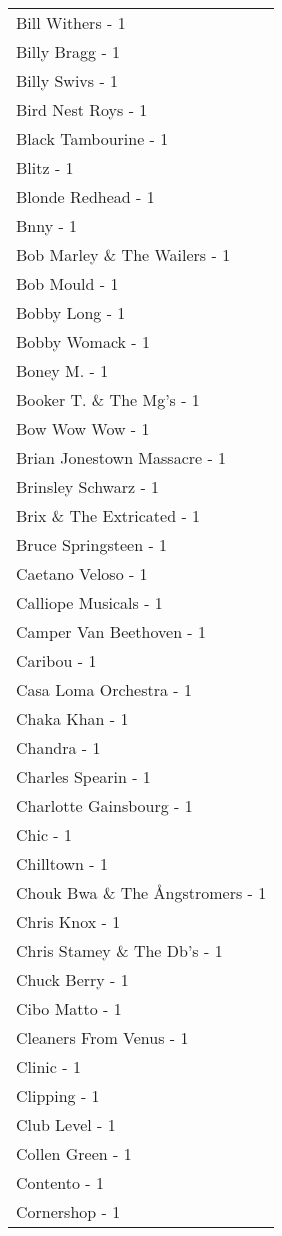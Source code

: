 \documentclass[
]{article}
\begin{document}
\begin{longtable}{l}
Bill Withers - 1 \\ 
Billy Bragg - 1 \\ 
Billy Swivs - 1 \\ 
Bird Nest Roys - 1 \\ 
Black Tambourine - 1 \\ 
Blitz - 1 \\ 
Blonde Redhead - 1 \\ 
Bnny - 1 \\ 
Bob Marley \& The Wailers - 1 \\ 
Bob Mould - 1 \\ 
Bobby Long - 1 \\ 
Bobby Womack - 1 \\ 
Boney M. - 1 \\ 
Booker T. \& The Mg's - 1 \\ 
Bow Wow Wow - 1 \\ 
Brian Jonestown Massacre - 1 \\ 
Brinsley Schwarz - 1 \\ 
Brix \& The Extricated - 1 \\ 
Bruce Springsteen - 1 \\ 
Caetano Veloso - 1 \\ 
Calliope Musicals - 1 \\ 
Camper Van Beethoven - 1 \\ 
Caribou - 1 \\ 
Casa Loma Orchestra - 1 \\ 
Chaka Khan - 1 \\ 
Chandra - 1 \\ 
Charles Spearin - 1 \\ 
Charlotte Gainsbourg - 1 \\ 
Chic - 1 \\ 
Chilltown - 1 \\ 
Chouk Bwa \& The Ångstromers - 1 \\ 
Chris Knox - 1 \\ 
Chris Stamey \& The Db's - 1 \\ 
Chuck Berry - 1 \\ 
Cibo Matto - 1 \\ 
Cleaners From Venus - 1 \\ 
Clinic - 1 \\ 
Clipping - 1 \\ 
Club Level - 1 \\ 
Collen Green - 1 \\ 
Contento - 1 \\ 
Cornershop - 1 \\ 

\end{longtable}
\end{document}
